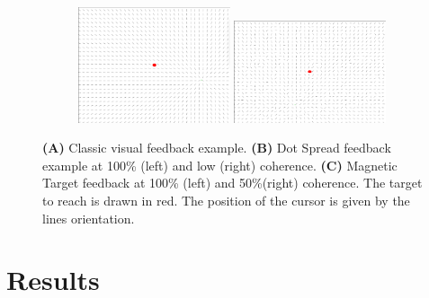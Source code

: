 \documentclass[preprint,12pt]{elsarticle}
\begin{document}
\begin{figure}[htbp]
\centering
\renewcommand{\thesubfigure}{\Alph{subfigure}}
\begin{subfigure}[b]{0.9\textwidth}
\caption{}
\end{subfigure}
\renewcommand{\thesubfigure}{\Alph{subfigure}}
\begin{subfigure}[b]{0.9\textwidth}
\caption{}
\end{subfigure}
\renewcommand{\thesubfigure}{\Alph{subfigure}}
\begin{subfigure}[b]{1\textwidth}
\caption{}
\includegraphics[width=0.49\textwidth,trim={7.5cm 4cm 2.5cm 2.5cm},clip]{images/MTcoherence100.pdf}
\includegraphics[width=0.49\textwidth,trim={2.5cm 0cm 7.5cm 5cm},clip]{images/MTcoherence50.pdf}
\end{subfigure}
\caption{\textbf{(A)} Classic visual feedback example. \textbf{(B)} Dot Spread feedback example at 100\% (left) and low (right) coherence. \textbf{(C)} Magnetic Target feedback at 100\% (left) and 50\%(right) coherence. The target to reach is drawn in red. The position of the cursor is given by the lines orientation.}
\label{fig:feedbacks}
\end{figure}

\section{Results}
\end{document}
